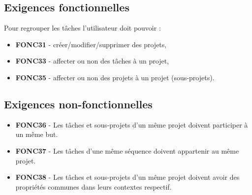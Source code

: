	\subsection{Exigences fonctionnelles}
		Pour regrouper les tâches l'utilisateur doit pouvoir :
		\begin{itemize}	\renewcommand{\labelitemi}{}
			\item \textbf{FONC31} - créer/modifier/supprimer des projets,
			\item \textbf{FONC33} - affecter ou non des tâches à un projet,
			\item \textbf{FONC35} - affecter ou non des projets à un projet (sous-projets).
		\end{itemize}
		
	\subsection{Exigences non-fonctionnelles}
		\begin{itemize}	\renewcommand{\labelitemi}{}
			\item \textbf{FONC36} - Les tâches et sous-projets d'un même projet doivent participer à un même but.
			\item \textbf{FONC37} - Les tâches d'une même séquence doivent appartenir au même projet.
			\item \textbf{FONC38} - Les tâches et sous-projets d'un même projet doivent avoir des propriétés communes dans leurs contextes respectif.			
		\end{itemize}
		
